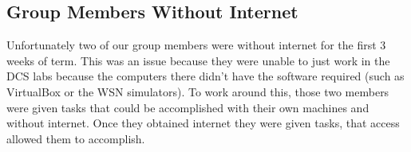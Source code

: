 \subsection{Group Members Without Internet}
Unfortunately two of our group members were without internet for the first 3 weeks of term. This was an issue because they were unable to just work in the DCS labs because the computers there didn't have the software required (such as VirtualBox or the WSN simulators). To work around this, those two members were given tasks that could be accomplished with their own machines and without internet. Once they obtained internet they were given tasks, that access allowed them to accomplish.
